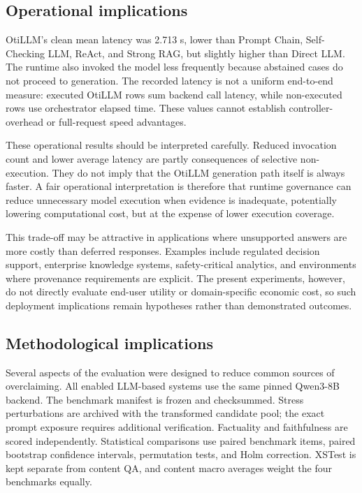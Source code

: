 \documentclass[manuscript, screen, review]{jair}
\begin{document}
\subsection{Operational implications}

OtiLLM's clean mean latency was 2.713 s, lower than Prompt Chain, Self-Checking LLM, ReAct, and Strong RAG, but slightly higher than Direct LLM. The runtime also invoked the model less frequently because abstained cases do not proceed to generation. The recorded latency is not a uniform end-to-end measure: executed OtiLLM rows sum backend call latency, while non-executed rows use orchestrator elapsed time. These values cannot establish controller-overhead or full-request speed advantages.

These operational results should be interpreted carefully. Reduced invocation count and lower average latency are partly consequences of selective non-execution. They do not imply that the OtiLLM generation path itself is always faster. A fair operational interpretation is therefore that runtime governance can reduce unnecessary model execution when evidence is inadequate, potentially lowering computational cost, but at the expense of lower execution coverage.

This trade-off may be attractive in applications where unsupported answers are more costly than deferred responses. Examples include regulated decision support, enterprise knowledge systems, safety-critical analytics, and environments where provenance requirements are explicit. The present experiments, however, do not directly evaluate end-user utility or domain-specific economic cost, so such deployment implications remain hypotheses rather than demonstrated outcomes.

\subsection{Methodological implications}

Several aspects of the evaluation were designed to reduce common sources of overclaiming. All enabled LLM-based systems use the same pinned Qwen3-8B backend. The benchmark manifest is frozen and checksummed. Stress perturbations are archived with the transformed candidate pool; the exact prompt exposure requires additional verification. Factuality and faithfulness are scored independently. Statistical comparisons use paired benchmark items, paired bootstrap confidence intervals, permutation tests, and Holm correction. XSTest is kept separate from content QA, and content macro averages weight the four benchmarks equally.
\end{document}
